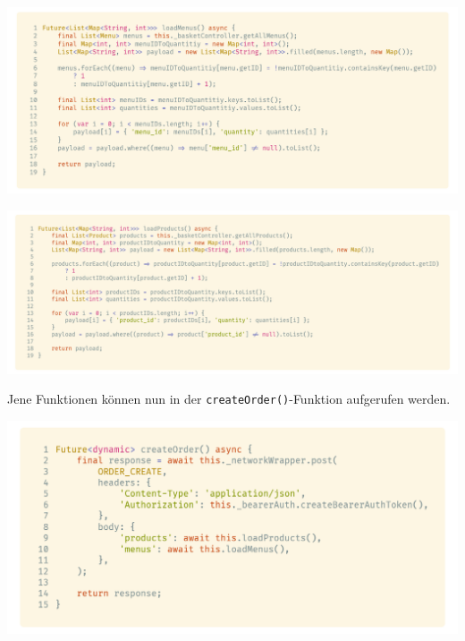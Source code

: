 \begin{code}[H]
    \centering
    \includegraphics[width=1\textwidth]{images/Client/services/manage-orders/createMenuPayload.png}
    \vspace{-25pt}
    \caption{\lstinline{loadMenus()}-Funktion zum Laden bestellter Menüs in den Request-Body}
\end{code}

\begin{code}[H]
    \centering
    \includegraphics[width=1\textwidth]{images/Client/services/manage-orders/createProductPayload.png}
    \vspace{-25pt}
    \caption{\lstinline{loadProducts()}-Funktion zum Laden bestellter Produkte in den Request-Body}
\end{code}

\newpage

Jene Funktionen können nun in der \lstinline{createOrder()}-Funktion aufgerufen werden.

\begin{code}[H]
    \centering
    \includegraphics[width=1\textwidth]{images/Client/services/manage-orders/createOrder.png}
    \vspace{-25pt}
    \caption{\lstinline{loadProducts()}-Funktion zum Laden bestellter Produkte in den Request-Body}
\end{code}

